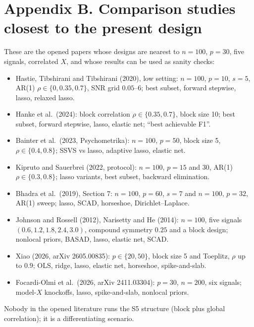 \documentclass[11pt,letterpaper]{article}
\begin{document}
\section*{Appendix B. Comparison studies closest to the present design}

These are the opened papers whose designs are nearest to $n=100$, $p=30$, five signals, correlated $X$, and whose results can be used as sanity checks:
\begin{itemize}
\item Hastie, Tibshirani and Tibshirani (2020), low setting: $n=100$, $p=10$, $s=5$, AR(1) $\rho\in\{0,0.35,0.7\}$, SNR grid $0.05$--$6$; best subset, forward stepwise, lasso, relaxed lasso.
\item Hanke et al.\ (2024): block correlation $\rho\in\{0.35,0.7\}$, block size 10; best subset, forward stepwise, lasso, elastic net; ``best achievable F1''.
\item Bainter et al.\ (2023, Psychometrika): $n=100$, $p=50$, block size 5, $\rho\in\{0.4,0.8\}$; SSVS vs lasso, adaptive lasso, elastic net.
\item Kipruto and Sauerbrei (2022, protocol): $n=100$, $p=15$ and $30$, AR(1) $\rho\in\{0.3,0.8\}$; lasso variants, best subset, backward elimination.
\item Bhadra et al.\ (2019), Section 7: $n=100$, $p=60$, $s=7$ and $n=100$, $p=32$, AR(1) sweep; lasso, SCAD, horseshoe, Dirichlet--Laplace.
\item Johnson and Rossell (2012), Narisetty and He (2014): $n=100$, five signals $(0.6,1.2,1.8,2.4,3.0)$, compound symmetry $0.25$ and a block design; nonlocal priors, BASAD, lasso, elastic net, SCAD.
\item Xiao (2026, arXiv 2605.00835): $p\in\{20,50\}$, block size 5 and Toeplitz, $\rho$ up to $0.9$; OLS, ridge, lasso, elastic net, horseshoe, spike-and-slab.
\item Focardi-Olmi et al.\ (2026, arXiv 2411.03304): $p=30$, $n=200$, six signals; model-$X$ knockoffs, lasso, spike-and-slab, nonlocal priors.
\end{itemize}
Nobody in the opened literature runs the S5 structure (block plus global correlation); it is a differentiating scenario.
\end{document}
